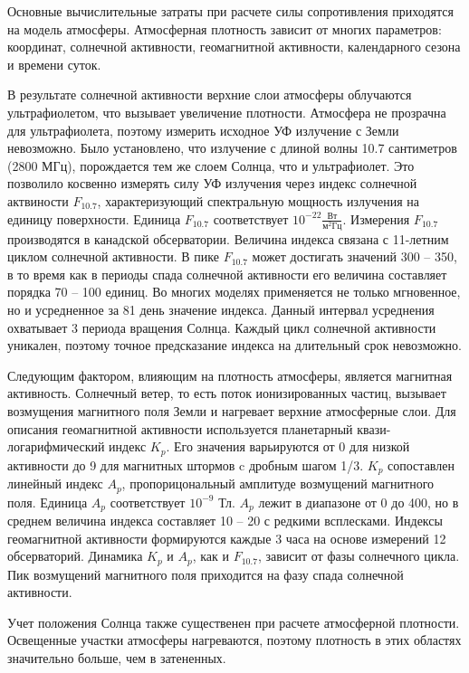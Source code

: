 Основные вычислительные затраты при расчете силы сопротивления приходятся на модель атмосферы.
Атмосферная плотность зависит от многих параметров: координат, солнечной активности,
геомагнитной активности, календарного сезона и времени суток.

В результате солнечной активности верхние слои атмосферы облучаются ультрафиолетом,
что вызывает увеличение плотности. Атмосфера не прозрачна для ультрафиолета,
поэтому измерить исходное УФ излучение с Земли невозможно. Было установлено, что
излучение с длиной волны 10.7 сантиметров (2800 МГц), порождается тем же слоем Солнца, что и
ультрафиолет. Это позволило косвенно измерять силу УФ излучения через индекс
солнечной актвиности $F_{10.7}$, характеризующий спектральную мощность излучения на единицу поверхности. Единица $F_{10.7}$ соответствует
$10^{-22} \frac{\text{Вт}}{\text{м}^2 \text{Гц}}$. 
Измерения $F_{10.7}$ производятся в канадской обсерватории. 
Величина индекса связана с 11-летним циклом солнечной активности. 
В пике $F_{10.7}$ может достигать значений 300 -- 350, в то время как в периоды спада
солнечной активности его величина составляет порядка 70 -- 100 единиц. 
Во многих моделях применяется не только мгновенное, но и усредненное за 81 день значение индекса.
Данный интервал усреднения охватывает 3 периода вращения Солнца. 
Каждый цикл солнечной активности уникален, 
поэтому точное предсказание индекса на длительный срок невозможно.

Следующим фактором, влияющим на плотность атмосферы, является магнитная активность.
Солнечный ветер, то есть поток ионизированных частиц, 
вызывает возмущения магнитного поля Земли и нагревает верхние атмосферные слои.
Для описания геомагнитной активности используется планетарный квази-логарифмический индекс $K_p$.
Его значения варьируются от 0 для низкой активности до 9 для магнитных штормов c дробным шагом 1/3. 
$K_p$ сопоставлен линейный индекс $A_p$, пропорицональный амплитуде возмущений магнитного поля.
Единица $A_p$ соответствует $10^{-9}$ Тл. $A_p$ лежит в диапазоне от 0 до 400, но в среднем величина индекса составляет 10 -- 20 с редкими всплесками.
Индексы геомагнитной активности формируются каждые 3 часа на основе измерений 12 обсерваторий.
Динамика $K_p$ и $A_p$, как и $F_{10.7}$, зависит от фазы солнечного цикла.
Пик возмущений магнитного поля приходится на фазу спада солнечной активности.

Учет положения Солнца также существенен при расчете атмосферной плотности.
Освещенные участки атмосферы нагреваются, поэтому плотность в этих областях значительно
больше, чем в затененных.


